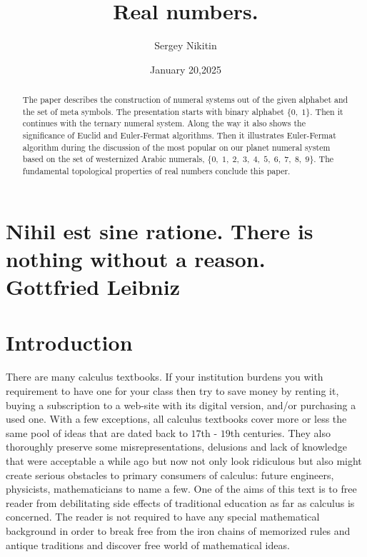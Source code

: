 \documentclass[color=black,11pt]{elegantpaper}
\title{Real numbers.}
\author{Sergey Nikitin}
\date{January 20,2025}
\begin{document}
\maketitle


\section*{Nihil est sine ratione. There is nothing without a reason.\\
                         Gottfried Leibniz }
\begin{abstract}
	The paper describes the construction of numeral systems out of the given alphabet and the set of meta symbols. The presentation starts with binary alphabet $\{0,\;1\}.$ Then it continues with the ternary numeral system. Along the way it also shows the significance of Euclid and Euler-Fermat algorithms. Then it illustrates Euler-Fermat algorithm during the discussion of the most popular on our planet numeral system based on the set of westernized Arabic numerals, $\{0,\;1,\;2,\;3,\;4,\;5,\;6,\;7,\;8,\;9\}.$ The fundamental topological properties of real numbers conclude this paper.
\end{abstract}	
\section*{Introduction}
There are many calculus textbooks. If your institution burdens you with requirement to have one for your class then try to save  money by renting it, buying a subscription to a web-site with its digital version, and/or purchasing a used one. With a few exceptions, all calculus textbooks cover more or less the same pool of ideas that are dated back to $17$th - $19$th centuries. They also thoroughly preserve some misrepresentations,  delusions and lack of knowledge that were acceptable a while ago but now not only look ridiculous but also might create serious obstacles to primary consumers of calculus: future engineers, physicists, mathematicians to name a few. One of the aims of this text is to free reader from debilitating side effects of traditional education as far as calculus is concerned. The reader is not required to have any special mathematical background in order to break free from the iron chains of memorized rules and antique traditions and discover free world of mathematical ideas.\\
\end{document}
